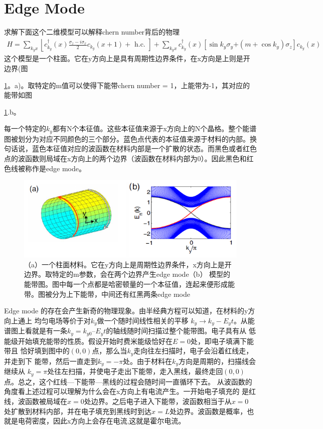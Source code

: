 \section{Edge Mode}

求解下面这个二维模型可以解释chern number背后的物理
\begin{equation}
\begin{aligned} H= \sum_{k_{y} x}\left\lfloor c_{k_{y}}^{\dagger}(x) \frac{\sigma_{z}-i \sigma_{x}}{2} c_{k_{y}}(x+1)+\text { h.c. }\right]+\sum_{k_{y} x} c_{k_{y}}^{\dagger}(x)\left[\sin k_{y} \sigma_{y}\right. \left.+\left(m+\cos k_{y}\right) \sigma_{z}\right] c_{k_{y}}(x) \end{aligned}
\end{equation}
这个模型是一个柱面。它在y方向上是具有周期性边界条件，在x方向是上则是开边界(图{\ref{edgePPT}。a)。取特定的m值可以使得下能带chern number = 1，上能带为-1，其对应的能带如图{\ref{edgePPT}.b。

每一个特定的$k_y$都有N个本征值。这些本征值来源于x方向上的N个晶格。整个能谱图被划分为对应不同颜色的三个部分。蓝色点代表的本征值来源于材料的内部。换句话说，蓝色本征值对应的波函数在材料内部是一个扩散的状态。而黑色或者红色点的波函数则局域在x方向上的两个边界（波函数在材料内部为0）。因此黑色和红色线被称作是edge mode。

\begin {figure}[tbp]
\centering 
\includegraphics[width=14cm]{./images/edgePPT.png} 
\caption{（a）一个柱面材料。它在y方向上是周期性边界条件，x方向上是开边界。取特定的m参数，会在两个边界产生edge mode（b） 模型的能带图。图中每一个点都是哈密顿量的一个本征值，连起来便形成能带。图被分为上下能带，中间还有红黑两条edge mode}
\label{edgePPT}
\end {figure} 

Edge mode 的存在会产生新奇的物理现象。由半经典方程可以知道，在材料的y方向上通上
均匀电场等价于对$k_y$做一个随时间线性相关的平移 $k_y \rightarrow k_y - E_y t$。从能
谱图上看就是有一条$k_y = k_{y0} – E_y t$的轴线随时间扫描过整个能带图。电子具有从
低能级开始填充能带的性质。假设开始时费米能级恰好在$E = 0$处，即电子填满下能带且
恰好填到图中的$(0, 0)$点，那么当$k_y$走向往左扫描时，电子会沿着红线走，并走到下
能带，然后一直走到$k_y = -\pi$处。由于材料在$k_y$方向是周期的，扫描线会继续从
$k_y= \pi$处往左扫描，并使电子走出下能带，走入黑线，最终走回$(0, 0)$点。总之，这个红线—下能带—黑线的过程会随时间一直循环下去。
  从波函数的角度看上述过程可以理解为什么会在x方向上有电流产生。一开始电子填充的
  是红线，波函数被局域在$x = 0$处边界。之后电子进入下能带，波函数相当于从$x = 0$
  处扩散到材料内部，并在电子填充到黑线时到达$x = L$处边界。波函数是概率，也就是电荷密度，因此x方向上会存在电流,这就是霍尔电流。
  
}}
